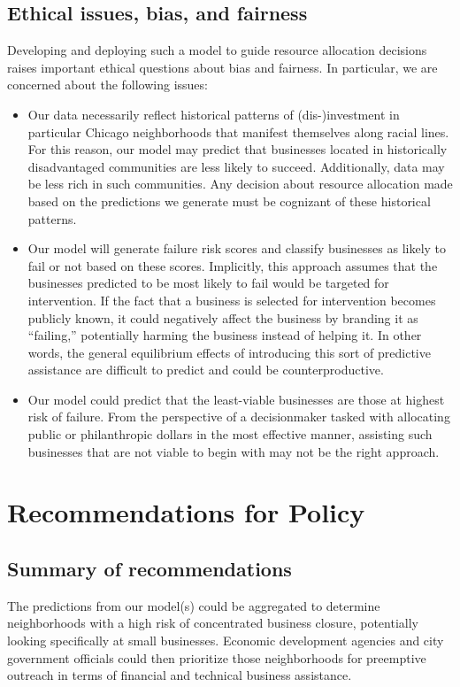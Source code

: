 \subsection{Ethical issues, bias, and fairness}
Developing and deploying such a model to guide resource allocation decisions raises important ethical questions about bias and fairness. In particular, we are concerned about the following issues:
\begin{itemize}
\item Our data necessarily reflect historical patterns of (dis-)investment in particular Chicago neighborhoods that manifest themselves along racial lines. For this reason, our model may predict that businesses located in historically disadvantaged communities are less likely to succeed. Additionally, data may be less rich in such communities. Any decision about resource allocation made based on the predictions we generate must be cognizant of these historical patterns. 
\item Our model will generate failure risk scores and classify businesses as likely to fail or not based on these scores. Implicitly, this approach assumes that the businesses predicted to be most likely to fail would be targeted for intervention. If the fact that a business is selected for intervention becomes publicly known, it could negatively affect the business by branding it as “failing,” potentially harming the business instead of helping it. In other words, the general equilibrium effects of introducing this sort of predictive assistance are difficult to predict and could be counterproductive.
\item Our model could predict that the least-viable businesses are those at highest risk of failure. From the perspective of a decisionmaker tasked with allocating public or philanthropic dollars in the most effective manner, assisting such businesses that are not viable to begin with may not be the right approach.

\end{itemize}

\section{Recommendations for Policy}
\subsection{Summary of recommendations}
The predictions from our model(s) could be aggregated to determine neighborhoods with a high risk of concentrated business closure, potentially looking specifically at small businesses. Economic development agencies and city government officials could then prioritize those neighborhoods for preemptive outreach in terms of financial and technical business assistance. 

